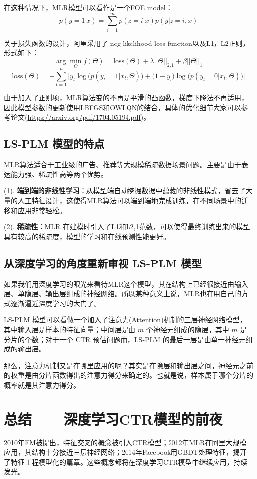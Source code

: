 \documentclass[12pt]{article}
\begin{document}
在这种情况下，MLR模型可以看作是一个FOE model：
$$
p(y=1|x) = \sum_{i=1}^mp(z=i|x)p(y|z=i,x)
$$

关于损失函数的设计，阿里采用了 neg-likelihood loss function以及L1，L2正则，形式如下：
$$
\arg\min_\Theta f(\Theta) = \text{loss}(\Theta) + \lambda||\Theta||_{2,1} + \beta||\Theta||_1
$$
$$
\text{loss}(\Theta) = -\sum_{t=1}^n\Bigg[y_t\log\Big(p(y_t=1|x_t,\Theta)\Big) + \Big(1-y_t\Big)\log\Big(p(y_t=0|x_t,\Theta)\Big)\Bigg]
$$

由于加入了正则项，MLR算法变的不再是平滑的凸函数，梯度下降法不再适用，因此模型参数的更新使用LBFGS和OWLQN的结合，具体的优化细节大家可以参考论文(\url{https://arxiv.org/pdf/1704.05194.pdf})。


\subsection{LS-PLM 模型的特点}
MLR算法适合于工业级的广告、推荐等大规模稀疏数据场景问题。主要是由于表达能力强、稀疏性高等两个优势。

(1). \textbf{端到端的非线性学习}：从模型端自动挖掘数据中蕴藏的非线性模式，省去了大量的人工特征设计，这使得MLR算法可以端到端地完成训练，在不同场景中的迁移和应用非常轻松。

(2). \textbf{稀疏性}：MLR 在建模时引入了L1和L2,1范数，可以使得最终训练出来的模型具有较高的稀疏度，模型的学习和在线预测性能更好。

\subsection{从深度学习的角度重新审视 LS-PLM 模型}
如果我们用深度学习的眼光来看待MLR这个模型，其在结构上已经很接近由输入层、单隐层、输出层组成的神经网络。所以某种意义上说，MLR也在用自己的方式逐渐逼近深度学习的大门了。

LS-PLM 模型可以看做一个加入了注意力(Attention)机制的三层神经网络模型，其中输入层是样本的特征向量；中间层是由 $m$ 个神经元组成的隐层，其中 $m$ 是分片的个数；对于一个 CTR 预估问题而，LS-PLM 的最后一层是由单一神经元组成的输出层。

那么，注意力机制又是在哪里应用的呢？其实是在隐层和输出层之间，神经元之前的权重是由分片函数得出的注意力得分来确定的。也就是说，样本属于哪个分片的概率就是其注意力得分。

\section{总结——深度学习CTR模型的前夜}
2010年FM被提出，特征交叉的概念被引入CTR模型；2012年MLR在阿里大规模应用，其结构十分接近三层神经网络；2014年Facebook用GBDT处理特征，揭开了特征工程模型化的篇章。这些概念都将在深度学习CTR模型中继续应用，持续发光。
\end{document}
